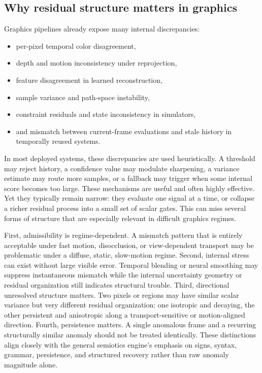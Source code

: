 \documentclass[11pt]{article}
\theoremstyle{definition}
\theoremstyle{plain}
\begin{document}
\subsection{Why residual structure matters in graphics}

Graphics pipelines already expose many internal discrepancies:
\begin{itemize}[leftmargin=1.5em]
    \item per-pixel temporal color disagreement,
    \item depth and motion inconsistency under reprojection,
    \item feature disagreement in learned reconstruction,
    \item sample variance and path-space instability,
    \item constraint residuals and state inconsistency in simulators,
    \item and mismatch between current-frame evaluations and stale history in temporally reused systems.
\end{itemize}

In most deployed systems, these discrepancies are used heuristically. A threshold may reject history, a confidence value may modulate sharpening, a variance estimate may route more samples, or a fallback may trigger when some internal score becomes too large. These mechanisms are useful and often highly effective. Yet they typically remain narrow: they evaluate one signal at a time, or collapse a richer residual process into a small set of scalar gates. This can miss several forms of structure that are especially relevant in difficult graphics regimes.

First, admissibility is regime-dependent. A mismatch pattern that is entirely acceptable under fast motion, disocclusion, or view-dependent transport may be problematic under a diffuse, static, slow-motion regime. Second, internal stress can exist without large visible error. Temporal blending or neural smoothing may suppress instantaneous mismatch while the internal uncertainty geometry or residual organization still indicates structural trouble. Third, directional unresolved structure matters. Two pixels or regions may have similar scalar variance but very different residual organization: one isotropic and decaying, the other persistent and anisotropic along a transport-sensitive or motion-aligned direction. Fourth, persistence matters. A single anomalous frame and a recurring structurally similar anomaly should not be treated identically. These distinctions align closely with the general semiotics engine’s emphasis on signs, syntax, grammar, persistence, and structured recovery rather than raw anomaly magnitude alone. 
\end{document}
